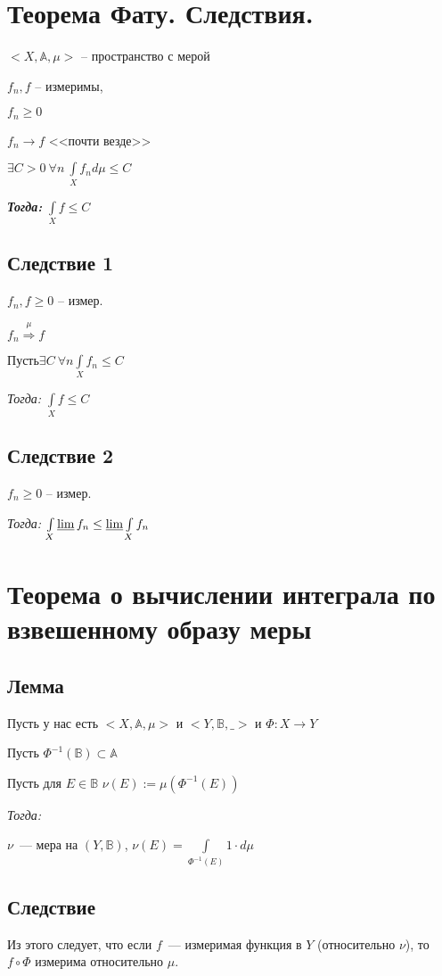 \documentclass[paper=a4, fontsize=14pt]{report}
\begin{document}
\section{Теорема Фату. Следствия.}
$<X, \mathds{A}, \mu>$ -- пространство с мерой

$f_n, f$ -- измеримы,

$f_n \geq 0$

$f_n \rightarrow f$ <<почти везде>>

$\exists C > 0 ~ \forall n ~ \int\limits_{X} f_n d\mu \leq C$

\textbf{\emph{Тогда:}}
$\int\limits_{X}f \leq C$

\subsection{Следствие 1}

$ f_n, f \geq 0$ -- измер.

$ f_n \stackrel{\mu}{\Rightarrow} f$

$ Пусть \exists C ~ \forall n  \int\limits_{X} f_n \leq C $

\emph{Тогда:}
$ \int\limits_{X}  f \leq C $

\subsection{Следствие 2}

$ f_n \geq 0 $ -- измер.

\emph{Тогда:}
$ \int\limits_{X} \varliminf f_n  \leq \varliminf \int\limits_{X} f_n $

\section{Теорема о вычислении интеграла по взвешенному образу меры}
	\subsection{Лемма}
		Пусть у нас есть $<X, \mathbb{A}, \mu>$ и $<Y, \mathbb{B}, \_>$ и $\Phi: X\rightarrow Y$

		Пусть  $\Phi^{-1}(\mathbb{B}) \subset \mathbb{A}$

		Пусть для $E \in \mathbb{B}$ $\nu(E):=\mu(\Phi^{-1}(E))$

		\emph{Тогда:}

		 $\nu$~--- мера на $(Y, \mathbb{B})$, $\nu(E) = \int\limits_{\Phi^{-1}(E)} 1 \cdot d\mu$

	\subsection{Следствие}
	Из этого следует, что если $f$~--- измеримая функция в $Y$ (относительно $\nu$), то $f\circ \Phi$ измерима относительно $\mu$.
\end{document}
